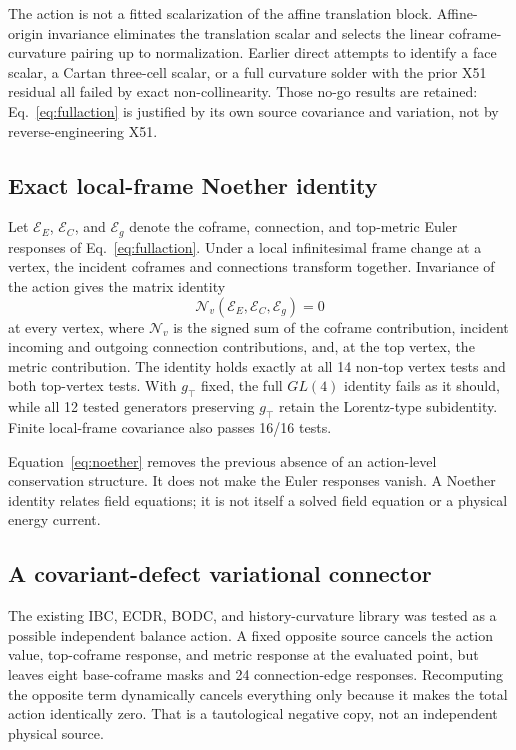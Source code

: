 The action is not a fitted scalarization of the affine translation block. Affine-origin invariance eliminates the translation scalar and selects the linear coframe-curvature pairing up to normalization. Earlier direct attempts to identify a face scalar, a Cartan three-cell scalar, or a full curvature solder with the prior X51 residual all failed by exact non-collinearity. Those no-go results are retained: Eq.~\eqref{eq:fullaction} is justified by its own source covariance and variation, not by reverse-engineering X51.

\subsection{Exact local-frame Noether identity}

Let $\mathcal E_E$, $\mathcal E_C$, and $\mathcal E_g$ denote the coframe, connection, and top-metric Euler responses of Eq.~\eqref{eq:fullaction}. Under a local infinitesimal frame change at a vertex, the incident coframes and connections transform together. Invariance of the action gives the matrix identity
\begin{equation}\label{eq:noether}
 \mathcal N_v(\mathcal E_E,\mathcal E_C,\mathcal E_g)=0
\end{equation}
at every vertex, where $\mathcal N_v$ is the signed sum of the coframe contribution, incident incoming and outgoing connection contributions, and, at the top vertex, the metric contribution. The identity holds exactly at all 14 non-top vertex tests and both top-vertex tests. With $g_\top$ fixed, the full $GL(4)$ identity fails as it should, while all 12 tested generators preserving $g_\top$ retain the Lorentz-type subidentity. Finite local-frame covariance also passes 16/16 tests.

Equation~\eqref{eq:noether} removes the previous absence of an action-level conservation structure. It does not make the Euler responses vanish. A Noether identity relates field equations; it is not itself a solved field equation or a physical energy current.

\subsection{A covariant-defect variational connector}

The existing IBC, ECDR, BODC, and history-curvature library was tested as a possible independent balance action. A fixed opposite source cancels the action value, top-coframe response, and metric response at the evaluated point, but leaves eight base-coframe masks and 24 connection-edge responses. Recomputing the opposite term dynamically cancels everything only because it makes the total action identically zero. That is a tautological negative copy, not an independent physical source.

